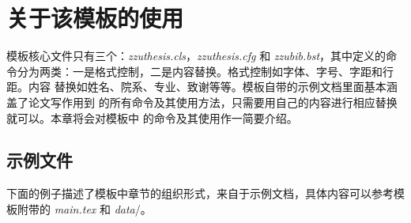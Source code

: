 \chapter{关于该模板的使用}
\label{cha:usage}

模板核心文件只有三个：\emph{zzuthesis.cls}，\emph{zzuthesis.cfg} 和
\emph{zzubib.bst}，其中定义的命
令分为两类：一是格式控制，二是内容替换。格式控制如字体、字号、字距和行距。内容
替换如姓名、院系、专业、致谢等等。模板自带的示例文档里面基本涵盖了论文写作用到
的所有命令及其使用方法，只需要用自己的内容进行相应替换就可以。本章将会对模板中
的命令及其使用作一简要介绍。

\section{\zzuthesis{} 示例文件}

下面的例子描述了模板中章节的组织形式，来自于示例文档，具体内容可以参考模板附带的 \emph{main.tex} 和 \emph{data}\//。
\begin{code}

\frontmatter
\makecover


\tableofcontents%
\listoffigures%
\listoftables%
\end{code}
\begin{code}
\mainmatter


\end{code}
\begin{code}
\backmatter




\begin{appendix}%
  
  
\end{appendix}



\end{code}

